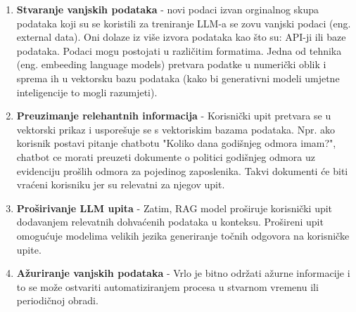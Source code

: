 \documentclass[]{foi}
\begin{document}
\begin{enumerate}
    \item \textbf{Stvaranje vanjskih podataka} - novi podaci izvan orginalnog skupa podataka koji su se koristili za treniranje LLM-a se zovu 
    vanjski podaci (eng. external data). Oni dolaze iz više izvora podataka kao što su: API-ji ili baze podataka. Podaci mogu postojati u različitim formatima.
    Jedna od tehnika (eng. embeeding language models) pretvara podatke u numerički oblik i sprema ih u vektorsku bazu podataka 
    (kako bi generativni modeli umjetne inteligencije to mogli razumjeti).
    \item \textbf{Preuzimanje relehantnih informacija} - Korisnički upit pretvara se u vektorski prikaz i usporešuje se s vektoriskim bazama podataka.
    Npr. ako korisnik postavi pitanje chatbotu "Koliko dana godišnjeg odmora imam?", chatbot ce morati preuzeti dokumente o politici godišnjeg 
    odmora uz evidenciju prošlih odmora za pojedinog zaposlenika. Takvi dokumenti će biti vraćeni korisniku jer su relevatni za njegov upit.
    \item \textbf{Proširivanje LLM upita} - Zatim, RAG model proširuje korisnički upit dodavanjem relevatnih dohvaćenih podataka u konteksu. 
    Prošireni upit omogućuje modelima velikih jezika generiranje točnih odgovora na korisničke upite.
    \item \textbf{Ažuriranje vanjskih podataka} - Vrlo je bitno održati ažurne informacije i to se može ostvariti automatiziranjem procesa u stvarnom vremenu ili periodičnoj obradi. 
\end{enumerate}

\newpage
\end{document}
